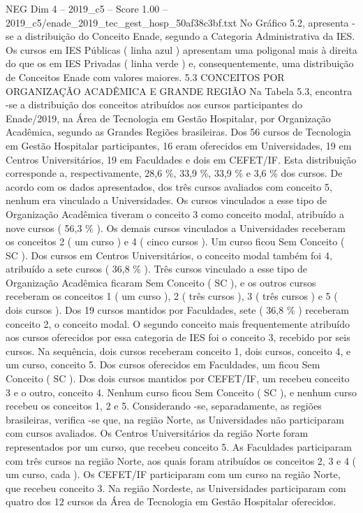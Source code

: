 \begin{textsample}{NEG Dim 4 – 2019\_c5 – Score 1.00 – 2019\_c5/enade\_2019\_tec\_gest\_hosp\_50af38c3bf.txt}
No Gráfico 5.2, apresenta -se a distribuição do Conceito Enade, segundo a Categoria Administrativa da IES.
Os cursos em IES Públicas ( linha azul ) apresentam uma poligonal mais à direita do que os em IES Privadas ( linha verde ) e, consequentemente, uma distribuição de Conceitos Enade com valores maiores. 5.3 CONCEITOS POR ORGANIZAÇÃO ACADÊMICA E GRANDE REGIÃO Na Tabela 5.3, encontra -se a distribuição dos conceitos atribuídos aos cursos participantes do Enade/2019, na Área de Tecnologia em Gestão Hospitalar, por Organização Acadêmica, segundo as Grandes Regiões brasileiras.
Dos 56 cursos de Tecnologia em Gestão Hospitalar participantes, 16 eram oferecidos em Universidades, 19 em Centros Universitários, 19 em Faculdades e dois em CEFET/IF.
Esta distribuição corresponde a, respectivamente, 28,6 \%, 33,9 \%, 33,9 \% e 3,6 \% dos cursos.
De acordo com os dados apresentados, dos três cursos avaliados com conceito 5, nenhum era vinculado a Universidades.
Os cursos vinculados a esse tipo de Organização Acadêmica tiveram o conceito 3 como conceito modal, atribuído a nove cursos ( 56,3 \% ).
Os demais cursos vinculados a Universidades receberam os conceitos 2 ( um curso ) e 4 ( cinco cursos ).
Um curso ficou Sem Conceito ( SC ).
Dos cursos em Centros Universitários, o conceito modal também foi 4, atribuído a sete cursos ( 36,8 \% ).
Três cursos vinculado a esse tipo de Organização Acadêmica ficaram Sem Conceito ( SC ), e os outros cursos receberam os conceitos 1 ( um curso ), 2 ( três cursos ), 3 ( três cursos ) e 5 ( dois cursos ).
Dos 19 cursos mantidos por Faculdades, sete ( 36,8 \% ) receberam conceito 2, o conceito modal.
O segundo conceito mais frequentemente atribuído aos cursos oferecidos por essa categoria de IES foi o conceito 3, recebido por seis cursos.
Na sequência, dois cursos receberam conceito 1, dois cursos, conceito 4, e um curso, conceito 5.
Dos cursos oferecidos em Faculdades, um ficou Sem Conceito ( SC ).
Dos dois cursos mantidos por CEFET/IF, um recebeu conceito 3 e o outro, conceito 4.
Nenhum curso ficou Sem Conceito ( SC ), e nenhum curso recebeu os conceitos 1, 2 e 5.
Considerando -se, separadamente, as regiões brasileiras, verifica -se que, na região Norte, as Universidades não participaram com cursos avaliados.
Os Centros Universitários da região Norte foram representados por um curso, que recebeu conceito 5.
As Faculdades participaram com três cursos na região Norte, aos quais foram atribuídos os conceitos 2, 3 e 4 ( um curso, cada ).
Os CEFET/IF participaram com um curso na região Norte, que recebeu conceito 3.
Na região Nordeste, as Universidades participaram com quatro dos 12 cursos da Área de Tecnologia em Gestão Hospitalar oferecidos.

\end{textsample}
